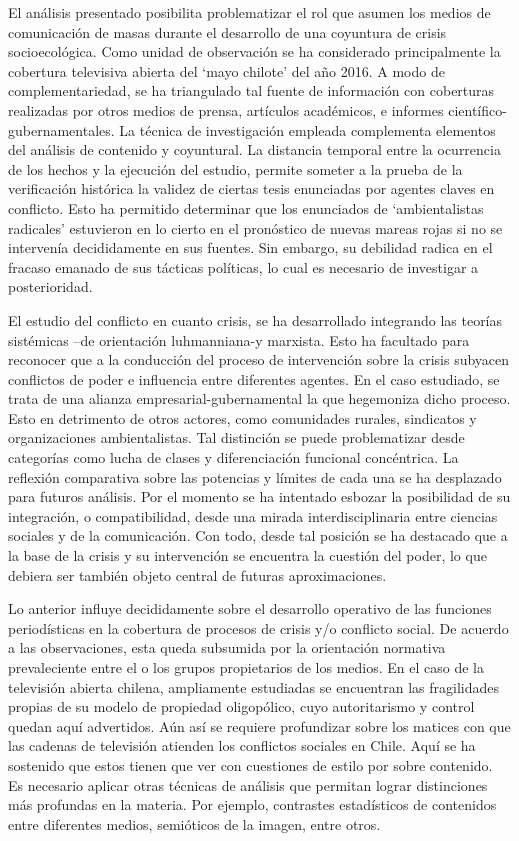 \documentclass{textolivre}
\begin{document}
El análisis presentado posibilita problematizar el rol que asumen los medios de
comunicación de masas durante el desarrollo de una coyuntura de crisis socioecológica.
Como unidad de observación se ha considerado principalmente la cobertura televisiva
abierta del ‘mayo chilote’ del año 2016. A modo de complementariedad, se ha triangulado
tal fuente de información con coberturas realizadas por otros medios de prensa, artículos
académicos, e informes científico-gubernamentales. La técnica de investigación empleada
complementa elementos del análisis de contenido y coyuntural. La distancia temporal
entre la ocurrencia de los hechos y la ejecución del estudio, permite someter a la prueba
de la verificación histórica la validez de ciertas tesis enunciadas por agentes claves en
conflicto. Esto ha permitido determinar que los enunciados de ‘ambientalistas radicales’
estuvieron en lo cierto en el pronóstico de nuevas mareas rojas si no se intervenía
decididamente en sus fuentes. Sin embargo, su debilidad radica en el fracaso emanado
de sus tácticas políticas, lo cual es necesario de investigar a posterioridad.

El estudio del conflicto en cuanto crisis, se ha desarrollado integrando las teorías
sistémicas --de orientación luhmanniana-y marxista. Esto ha facultado para reconocer
que a la conducción del proceso de intervención sobre la crisis subyacen conflictos de
poder e influencia entre diferentes agentes. En el caso estudiado, se trata de una alianza
empresarial-gubernamental la que hegemoniza dicho proceso. Esto en detrimento de
otros actores, como comunidades rurales, sindicatos y organizaciones ambientalistas. Tal
distinción se puede problematizar desde categorías como lucha de clases y diferenciación
funcional concéntrica. La reflexión comparativa sobre las potencias y límites de cada una
se ha desplazado para futuros análisis. Por el momento se ha intentado esbozar la
posibilidad de su integración, o compatibilidad, desde una mirada interdisciplinaria entre
ciencias sociales y de la comunicación. Con todo, desde tal posición se ha destacado que
a la base de la crisis y su intervención se encuentra la cuestión del poder, lo que debiera
ser también objeto central de futuras aproximaciones.

Lo anterior influye decididamente sobre el desarrollo operativo de las funciones
periodísticas en la cobertura de procesos de crisis y/o conflicto social. De acuerdo a las
observaciones, esta queda subsumida por la orientación normativa prevaleciente entre el
o los grupos propietarios de los medios. En el caso de la televisión abierta chilena,
ampliamente estudiadas se encuentran las fragilidades propias de su modelo de
propiedad oligopólico, cuyo autoritarismo y control quedan aquí advertidos. Aún así se
requiere profundizar sobre los matices con que las cadenas de televisión atienden los
conflictos sociales en Chile. Aquí se ha sostenido que estos tienen que ver con cuestiones
de estilo por sobre contenido. Es necesario aplicar otras técnicas de análisis que permitan
lograr distinciones más profundas en la materia. Por ejemplo, contrastes estadísticos de
contenidos entre diferentes medios, semióticos de la imagen, entre otros.
\end{document}
